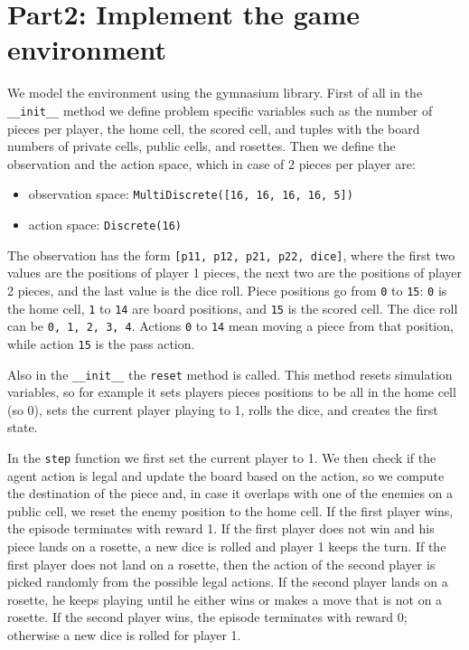 \section{Part2: Implement the game environment}

We model the environment using the gymnasium library. First of all in the \texttt{\_\_init\_\_} method we define problem specific variables such as the number of pieces per player, the home cell, the scored cell, and tuples with the board numbers of private cells, public cells, and rosettes. Then we define the observation and the action space, which in case of 2 pieces per player are:

\begin{itemize}
\item observation space: \texttt{MultiDiscrete([16, 16, 16, 16, 5])}
\item action space: \texttt{Discrete(16)}
\end{itemize}

The observation has the form \texttt{[p11, p12, p21, p22, dice]}, where the first two values are the positions of player 1 pieces, the next two are the positions of player 2 pieces, and the last value is the dice roll. Piece positions go from \texttt{0} to \texttt{15}: \texttt{0} is the home cell, \texttt{1} to \texttt{14} are board positions, and \texttt{15} is the scored cell. The dice roll can be \texttt{0, 1, 2, 3, 4}. Actions \texttt{0} to \texttt{14} mean moving a piece from that position, while action \texttt{15} is the pass action.

Also in the \texttt{\_\_init\_\_} the \texttt{reset} method is called. This method resets simulation variables, so for example it sets players pieces positions to be all in the home cell (so 0), sets the current player playing to 1, rolls the dice, and creates the first state.

In the \texttt{step} function we first set the current player to 1. We then check if the agent action is legal and update the board based on the action, so we compute the destination of the piece and, in case it overlaps with one of the enemies on a public cell, we reset the enemy position to the home cell. If the first player wins, the episode terminates with reward 1. If the first player does not win and his piece lands on a rosette, a new dice is rolled and player 1 keeps the turn. If the first player does not land on a rosette, then the action of the second player is picked randomly from the possible legal actions. If the second player lands on a rosette, he keeps playing until he either wins or makes a move that is not on a rosette. If the second player wins, the episode terminates with reward 0; otherwise a new dice is rolled for player 1.

